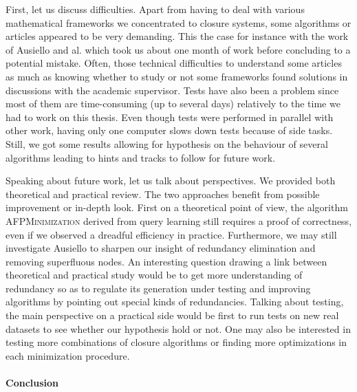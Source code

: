 First, let us discuss difficulties. Apart from having to deal with various mathematical frameworks we concentrated to closure systems, some algorithms
or articles appeared to be very demanding. This the case for instance with the work of Ausiello and al. which took us about one month of work before concluding to a potential mistake. Often, those technical difficulties to understand some articles as much as knowing whether to study or not some frameworks found solutions in discussions with the academic supervisor. Tests have also been a problem since most of them are time-consuming (up to several days) relatively to the time we had to work on this thesis. Even though tests were performed in parallel with other work, having only one computer slows down tests because of side tasks. Still, we got some results allowing for hypothesis
on the behaviour of several algorithms leading to hints and tracks to follow for future work.

\vspace{1.2em}

Speaking about future work, let us talk about perspectives. We provided both theoretical and practical review. The two approaches benefit from possible improvement or in-depth look. First on a theoretical point of view, the algorithm \textsc{AFPMinimization} derived from query learning still requires
a proof of correctness, even if we observed a dreadful efficiency in practice. Furthermore, we may still investigate Ausiello to sharpen our insight of redundancy elimination and removing superfluous nodes. An interesting question
drawing a link between theoretical and practical study would be to get more
understanding of redundancy so as to regulate its generation under testing and
improving algorithms by pointing out special kinds of redundancies. Talking about testing, the main perspective on a practical side would be first to run tests on new real datasets to see whether our hypothesis hold or not. One may also be interested in testing more combinations of closure algorithms or finding
more optimizations in each minimization procedure.


\paragraph{Conclusion}


